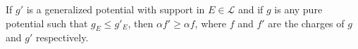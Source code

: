 If $g'$ is a generalized potential with support in $E \in \mathcal{L}$ and if $g$ is any pure potential such that $g_E \leq g'_E$, then $\alpha f' \geq \alpha f$, where $f$ and $f'$ are the charges of $g$ and $g'$ respectively.
